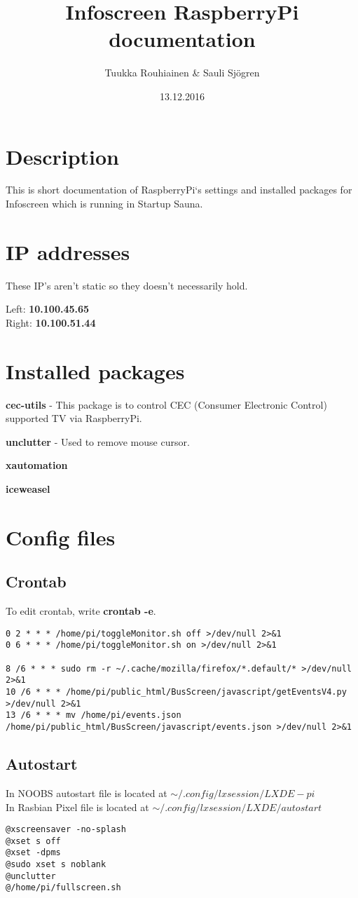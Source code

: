 \documentclass{article}
\title{Infoscreen RaspberryPi documentation}
\author{Tuukka Rouhiainen \& Sauli Sjögren}
\begin{document}
\date{13.12.2016}
\maketitle
\thispagestyle{fancy}

\section{Description}
This is short documentation of RaspberryPi`s settings and installed packages for Infoscreen which is running in Startup Sauna.
\section{IP addresses}
These IP's aren't static so they doesn't necessarily hold.

Left: \textbf{10.100.45.65} \\
Right: \textbf{10.100.51.44}
\section{Installed packages}
\textbf{cec-utils} - This package is to control CEC (Consumer Electronic Control) supported TV via RaspberryPi.

\textbf{unclutter} - Used to remove mouse cursor.

\textbf{xautomation}

\textbf{iceweasel}
\section{Config files}
\subsection{Crontab}
To edit crontab, write \textbf{crontab -e}.
\begin{verbatim}
0 2 * * * /home/pi/toggleMonitor.sh off >/dev/null 2>&1
0 6 * * * /home/pi/toggleMonitor.sh on >/dev/null 2>&1

8 /6 * * * sudo rm -r ~/.cache/mozilla/firefox/*.default/* >/dev/null 2>&1
10 /6 * * * /home/pi/public_html/BusScreen/javascript/getEventsV4.py >/dev/null 2>&1
13 /6 * * * mv /home/pi/events.json /home/pi/public_html/BusScreen/javascript/events.json >/dev/null 2>&1
\end{verbatim}
\subsection{Autostart}
In NOOBS autostart file is located at $\sim/.config/lxsession/LXDE-pi$ \\
In Rasbian Pixel file is located at $\sim/.config/lxsession/LXDE/autostart$
\begin{verbatim}
@xscreensaver -no-splash
@xset s off
@xset -dpms
@sudo xset s noblank
@unclutter
@/home/pi/fullscreen.sh
\end{verbatim}
\end{document}
